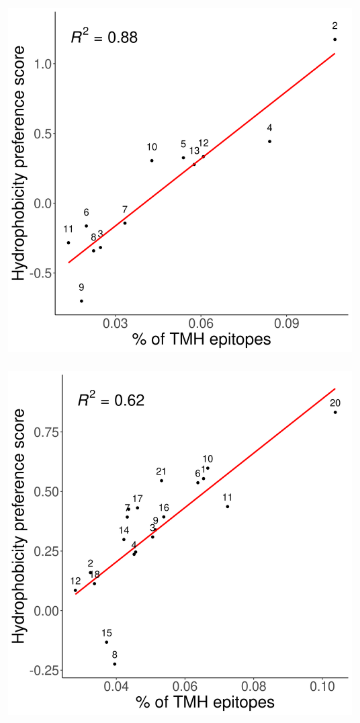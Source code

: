 \begin{figure}[!htbp]
  \begin{subfigure}[t]{0.35\textwidth}
    \centering
    \caption{}
    \includegraphics[width=\linewidth]{bbbq_1_smart_results/fig_hydrophobicity_mhc1.png}
    \label{fig:hydrophobicity_1}
  \end{subfigure}  
  \hfill
  \begin{subfigure}[t]{0.35\textwidth}
    \centering
    \caption{}
    \includegraphics[width=\linewidth]{bbbq_1_smart_results/fig_hydrophobicity_mhc2.png}

\end{subfigure}
\end{figure}
